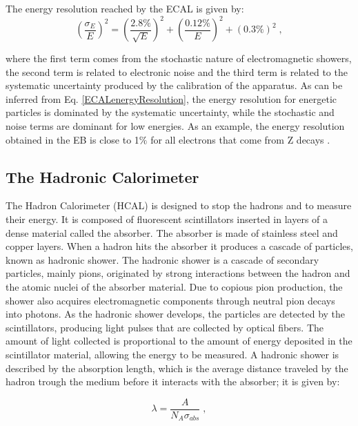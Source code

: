 \noindent The energy resolution reached by the ECAL is given by:
\begin{equation} \label{ECALenergyResolution}
 \left(\frac{\sigma_{E}}{E}\right)^{2} = \left(\frac{2.8\%}{\sqrt{E}}\right)^{2} + \left(\frac{0.12\%}{E}\right)^{2} + \left(0.3\% \right)^{2} \;, 
\end{equation}

\noindent where the first term comes from the stochastic nature of electromagnetic showers, the second term is 
related to electronic noise and the third term is related to the systematic uncertainty produced 
by the calibration of the apparatus. As can be inferred from
Eq. \ref{ECALenergyResolution}, the energy resolution for energetic particles is dominated by the systematic uncertainty, while
the stochastic and noise terms are dominant for low energies. As an example, the energy resolution 
obtained in the EB is close to 1$\%$ for all electrons that come from Z decays \cite{ECALperformance}.

\subsection{The Hadronic Calorimeter}
\label{subsec:HCal}

\noindent The Hadron Calorimeter (HCAL) is designed to stop the hadrons and to measure 
their energy. It is composed of fluorescent scintillators inserted in layers of 
a dense material called the absorber. The absorber is made of stainless 
steel and copper layers. When a hadron hits the absorber it produces a cascade of 
particles, known as hadronic shower. The hadronic shower is a cascade of 
secondary particles, mainly pions, originated by strong interactions between 
the hadron and the atomic nuclei of the absorber material. Due to copious pion
production, the shower also acquires electromagnetic components through
neutral pion decays into photons. As the hadronic shower develops, the particles 
are detected by the scintillators, producing light pulses that are collected by 
optical fibers. The amount of light collected is proportional to the amount 
 of energy deposited in the scintillator material, allowing the energy to be measured. A hadronic 
 shower is described by the absorption length, which is the average distance traveled by the 
 hadron trough the medium before it interacts with the absorber; it is given by:

 \begin{equation}
 \lambda = \frac{A}{N_{A} \sigma_{abs}}  \;,
\end{equation}

